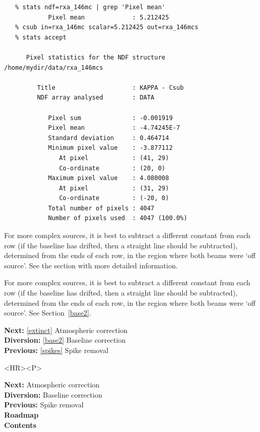 \documentclass[11pt]{article}
\newenvironment{latexonly}{}{}
\newcommand{\htmlref}[2]{#1}
\begin{document}
\begin{verbatim}
   % stats ndf=rxa_146mc | grep 'Pixel mean'
            Pixel mean             : 5.212425
   % csub in=rxa_146mc scalar=5.212425 out=rxa_146mcs
   % stats accept

      Pixel statistics for the NDF structure /home/mydir/data/rxa_146mcs

         Title                     : KAPPA - Csub
         NDF array analysed        : DATA

            Pixel sum              : -0.001919
            Pixel mean             : -4.74245E-7
            Standard deviation     : 0.464714
            Minimum pixel value    : -3.877112
               At pixel            : (41, 29)
               Co-ordinate         : (20, 0)
            Maximum pixel value    : 4.080008
               At pixel            : (31, 29)
               Co-ordinate         : (-20, 0)
            Total number of pixels : 4047
            Number of pixels used  : 4047 (100.0%)
\end{verbatim}

\begin{htmlonly}
   For more complex sources, it is best
   to subtract a different constant from each row (if the baseline has
   drifted, then a straight line should be subtracted), determined from
   the ends of each row, in the region where both beams were `off source'.
   See the section with
\htmlref{more detailed information.}{base2}
\end{htmlonly}
\begin{latexonly}
   For more complex sources, it is best
   to subtract a different constant from each row (if the baseline has
   drifted, then a straight line should be subtracted), determined from
   the ends of each row, in the region where both beams were `off source'.
   See
Section~\ref{base2}.
\end{latexonly}

\begin{latexonly}
{\bf Next:} \ref{extinct} Atmospheric correction\\
{\bf Diversion:} \ref{base2} Baseline correction\\
{\bf Previous:} \ref{spikes} Spike removal\\
\end{latexonly}

\begin{htmlonly}
\begin{rawhtml} <HR><P> \end{rawhtml}
{\bf \htmlref{Next:}{extinct}} Atmospheric correction\\
{\bf \htmlref{Diversion:}{base2}} Baseline correction\\
{\bf \htmlref{Previous:}{spikes}} Spike removal\\
{\bf \htmlref{Roadmap}{roadmap}}\\
{\bf \htmlref{Contents}{stardoccontents}}\\
\end{htmlonly}
\end{document}
